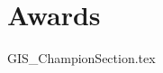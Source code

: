 \documentclass[class=book , crop=false]{standalone} %
\begin{document}
\chapter{Awards}
{GIS_ChampionSection.tex}
\end{document}
